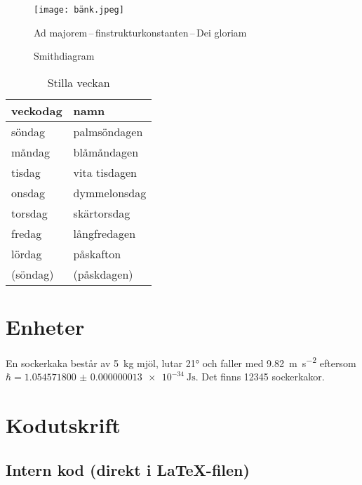 \documentclass[a4paper, article, oneside, leqno]{memoir}
\begin{document}
\begin{figure}[ht]
  \centering
  \texttt{[image: bänk.jpeg]}
  \caption{Ad majorem\,--\,finstrukturkonstanten\,--\,Dei gloriam}
  \label{fig:bänk}
\end{figure}

\begin{figure}[ht]
  \centering
  
  \caption{Smithdiagram}
  \label{fig:smith}
\end{figure}

\begin{table}[ht]  
  \centering
  \begin{tabular}{ll}
    \toprule
    veckodag & namn \\
    \midrule
    söndag & palmsöndagen \\
    måndag & blåmåndagen \\
    tisdag & vita tisdagen \\
    onsdag & dymmelonsdag \\
    torsdag & skärtorsdag \\
    fredag & långfredagen \\
    lördag & påskafton \\
    (söndag) & (påskdagen) \\
    \bottomrule
  \end{tabular}
  \caption{Stilla veckan}
  \label{tab:stilla}
\end{table}

\chapter{Enheter}


En sockerkaka består av \SI{5}{\kilo\gram} mjöl, lutar \ang{21} och faller med \SI{9,82}{\meter\per\second^2} eftersom $\hbar = \SI{1.054571800(13)e-34}{\joule\second}$. Det finns \num{12345} sockerkakor.

\appendix
\chapter{Kodutskrift}


\section{Intern kod (direkt i LaTeX-filen)}
\end{document}
